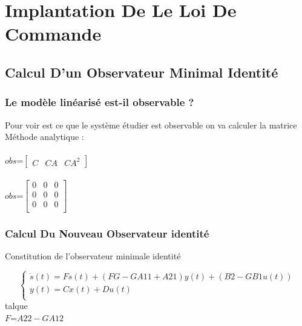 \chapter{Implantation De Le Loi De Commande}
      
       
 
 
 \section{Calcul D’un Observateur Minimal Identité}

 \subsection{Le modèle linéarisé est-il observable ?}
 
 Pour voir est ce que le système étudier est observable   on va calculer la matrice \\
 Méthode analytique :\\\\
      $obs$=$\begin{bmatrix}
      C & CA & CA^{2}
      \end{bmatrix}$\\\\
      
      $obs$=$\begin{bmatrix}
      0 & 0 & 0 \\
      0 & 0 & 0 \\
      0 & 0 & 0 \\
      \end{bmatrix}$
 
 
 \subsection{Calcul Du Nouveau Observateur identité }
Constitution de l'observateur minimale identité

\begin{equation}
\left\{\begin{matrix}
\dot{s}(t)=Fs(t)+(FG-GA{11}+A{21})y(t)+(B2-GB{1}u(t))\\
 y(t)=Cx(t)+Du(t)\\
\end{matrix}\right.
\end{equation}   
talque\\ 
$F$=$A{22}-GA{12}$ 
  
